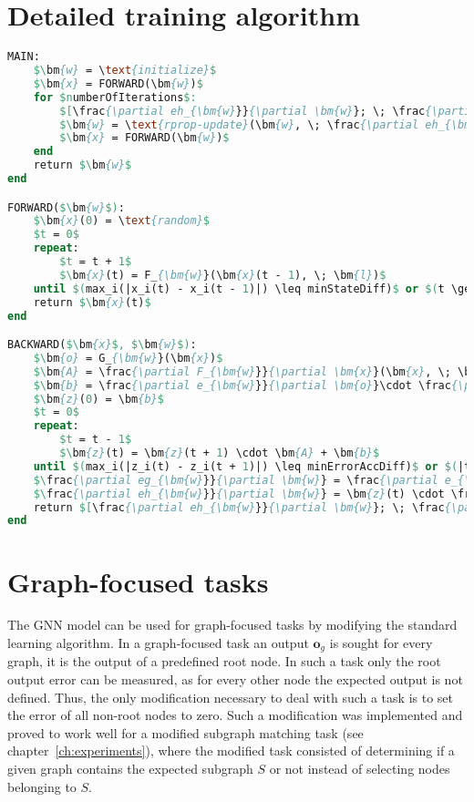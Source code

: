 \section{Detailed training algorithm}
\begin{lstlisting}[mathescape, style=outcode, language=pascal, caption=The learning algorithm]
MAIN:
	$\bm{w} = \text{initialize}$
	$\bm{x} = FORWARD(\bm{w})$
	for $numberOfIterations$:
		$[\frac{\partial eh_{\bm{w}}}{\partial \bm{w}}; \; \frac{\partial eg_{\bm{w}}}{\partial \bm{w}}] = BACKWARD(\bm{x}, \; \bm{w})$
		$\bm{w} = \text{rprop-update}(\bm{w}, \; \frac{\partial eh_{\bm{w}}}{\partial \bm{w}}, \; \frac{\partial eg_{\bm{w}}}{\partial \bm{w}})$
		$\bm{x} = FORWARD(\bm{w})$
	end
	return $\bm{w}$
end

FORWARD($\bm{w}$):
	$\bm{x}(0) = \text{random}$
	$t = 0$
	repeat:
		$t = t + 1$
		$\bm{x}(t) = F_{\bm{w}}(\bm{x}(t - 1), \; \bm{l})$
	until $(max_i(|x_i(t) - x_i(t - 1)|) \leq minStateDiff)$ or $(t \geq maxForwardSteps)$
	return $\bm{x}(t)$
end

BACKWARD($\bm{x}$, $\bm{w}$):
	$\bm{o} = G_{\bm{w}}(\bm{x})$
	$\bm{A} = \frac{\partial F_{\bm{w}}}{\partial \bm{x}}(\bm{x}, \; \bm{l})$
	$\bm{b} = \frac{\partial e_{\bm{w}}}{\partial \bm{o}}\cdot \frac{\partial G_{\bm{w}}}{\partial \bm{x}}(\bm{x})$
	$\bm{z}(0) = \bm{b}$
	$t = 0$
	repeat:
		$t = t - 1$
		$\bm{z}(t) = \bm{z}(t + 1) \cdot \bm{A} + \bm{b}$
	until $(max_i(|z_i(t) - z_i(t + 1)|) \leq minErrorAccDiff)$ or $(|t| \geq maxBackwardSteps)$
	$\frac{\partial eg_{\bm{w}}}{\partial \bm{w}} = \frac{\partial e_{\bm{w}}}{\partial \bm{o}}\cdot \frac{\partial G_{\bm{w}}}{\partial \bm{w}}(\bm{x})$
	$\frac{\partial eh_{\bm{w}}}{\partial \bm{w}} = \bm{z}(t) \cdot \frac{\partial F_{\bm{w}}}{\partial \bm{w}}(\bm{x}, \bm{l}) + \frac{\partial p_{\bm{w}}}{\partial \bm{w}}$
	return $[\frac{\partial eh_{\bm{w}}}{\partial \bm{w}}; \; \frac{\partial eg_{\bm{w}}}{\partial \bm{w}}]$
end
\end{lstlisting}

\section{Graph-focused tasks}
The GNN model can be used for graph-focused tasks by modifying the standard learning algorithm. In a graph-focused task an output $\bm{o}_g$ is sought for every graph, it is the output of a predefined root node. In such a task only the root output error can be measured, as for every other node the expected output is not defined. Thus, the only modification necessary to deal with such a task is to set the error of all non-root nodes to zero. Such a modification was implemented and proved to work well for a modified subgraph matching task (see chapter~\ref{ch:experiments}), where the modified task consisted of determining if a given graph contains the expected subgraph $S$ or not instead of selecting nodes belonging to $S$.
